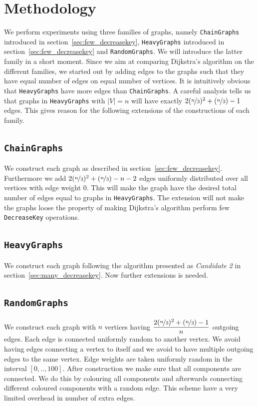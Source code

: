 \documentclass[a4paper,oneside,article,11pt]{memoir}
\begin{document}
\section{Methodology}
We perform experiments using three families of graphs, namely \texttt{ChainGraphs} introduced in section~\ref{sec:few_decreasekey}, \texttt{HeavyGraphs} introduced in section~\ref{sec:few_decreasekey} and \texttt{RandomGraphs}. We will introduce the latter family in a short moment. Since we aim at comparing Dijkstra's algorithm on the different families, we started out by adding edges to the graphs such that they have equal number of edges on equal number of vertices. It is intuitively obvious that \texttt{HeavyGraphs} have more edges than \texttt{ChainGraphs}. A careful analysis tells us that graphs in \texttt{HeavyGraphs} with $\lvert V \rvert = n$ will have exactly $2(\nicefrac{n}{3})^2 + (\nicefrac{n}{3})-1$ edges. This gives reason for the following extensions of the constructions of each family.

\subsection{\texttt{ChainGraphs}}
We construct each graph as described in section~\ref{sec:few_decreasekey}. Furthermore we add $2(\nicefrac{n}{3})^2 + (\nicefrac{n}{3})- n - 2$ edges uniformly distributed over all vertices with edge weight $0$. This will make the graph have the desired total number of edges equal to graphs in \texttt{HeavyGraphs}. The extension will not make the graphs loose the property of making Dijkstra's algorithm perform few \texttt{DecreaseKey} operations.

\subsection{\texttt{HeavyGraphs}}
We construct each graph following the algorithm presented as \textit{Candidate 2} in section~\ref{sec:many_decreasekey}. Now further extensions is needed.

\subsection{\texttt{RandomGraphs}}
We construct each graph with $n$ vertices having $\dfrac{2(\nicefrac{n}{3})^2 + (\nicefrac{n}{3})-1}{n}$ outgoing edges. Each edge is connected uniformly random to another vertex. We avoid having edges connecting a vertex to itself and we avoid to have multiple outgoing edges to the same vertex. Edge weights are taken uniformly random in the interval $[0, .., 100]$. After construction we make sure that all components are connected. We do this by colouring all components and afterwards connecting different coloured components with a random edge. This scheme have a very limited overhead in number of extra edges.
\end{document}
